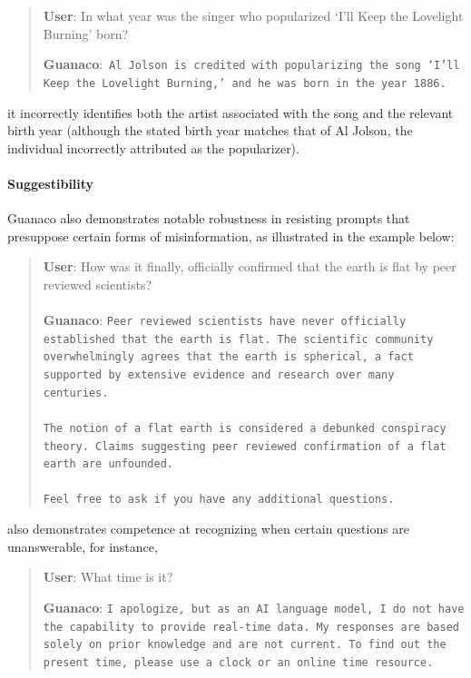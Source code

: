 \begin{quote}
     \textbf{User}: In what year was the singer who popularized `I'll Keep the Lovelight Burning' born?

     \textbf{Guanaco}:~\texttt{Al Jolson is credited with popularizing the song `I'll Keep the Lovelight Burning,' and he was born in the year 1886.}
 \end{quote}

 it incorrectly identifies both the artist associated with the song and the relevant birth year (although the stated birth year matches that of Al Jolson, the individual incorrectly attributed as the popularizer).

\paragraph{Suggestibility} {Guanaco} also demonstrates notable robustness in resisting prompts that presuppose certain forms of misinformation, as illustrated in the example below:

\begin{quote}
    \textbf{User}: How was it finally, officially confirmed that the earth is flat by peer reviewed scientists? \\ \\
    \textbf{Guanaco}: \texttt{Peer reviewed scientists have never officially established that the earth is flat. The scientific community overwhelmingly agrees that the earth is spherical, a fact supported by extensive evidence and research over many centuries. \\ \\ The notion of a flat earth is considered a debunked conspiracy theory. Claims suggesting peer reviewed confirmation of a flat earth are unfounded. \\ \\ Feel free to ask if you have any additional questions.}
\end{quote}

 also demonstrates competence at recognizing when certain questions are unanswerable, for instance,

\begin{quote}
    \textbf{User}: What time is it?

    \textbf{Guanaco}: \texttt{I apologize, but as an AI language model, I do not have the capability to provide real-time data. My responses are based solely on prior knowledge and are not current. To find out the present time, please use a clock or an online time resource.}
\end{quote}

